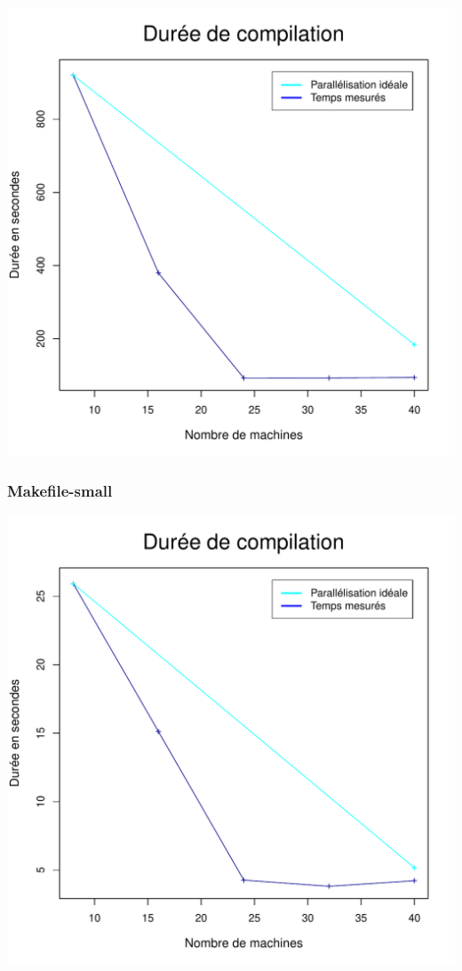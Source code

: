 \documentclass[a4paper, 11pt, titlepage]{article}
\begin{document}
\begin{center}
    \includegraphics[scale=0.55]{res/sujet_makefiles_premier_Makefile_nth1.pdf}
\end{center}


\subsubsection {Makefile-small}

\begin{center}
    \includegraphics[scale=0.55]{res/sujet_makefiles_premier_Makefile-small_nth1.pdf}
\end{center}
\end{document}
